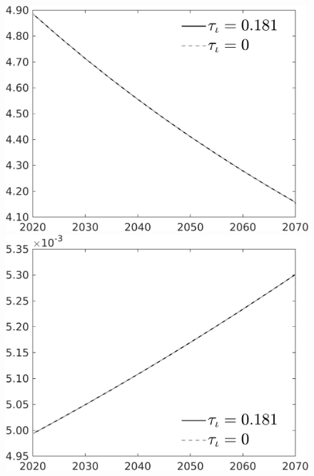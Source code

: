 \documentclass[12pt]{article}
\begin{document}
\begin{figure}[h!!]
\begin{minipage}[]{0.32\textwidth}
	\end{minipage}	
	\begin{minipage}[]{0.32\textwidth}
		\includegraphics[width=1\textwidth]{../../codding_model/own_basedOnFried/optimalPol_010922_revision/figures/all_13Sept22/CompTauf_bytaul_Reg0_gAn_spillover0_nsk0_xgr1_knspil0_sep0_LFlimit1_emsbase0_countec0_GovRev0_etaa0.79_lgd1.png}
	\end{minipage}	
	\begin{minipage}[]{0.32\textwidth}
		\includegraphics[width=1\textwidth]{../../codding_model/own_basedOnFried/optimalPol_010922_revision/figures/all_13Sept22/CompTauf_bytaul_Reg0_gAg_spillover0_nsk0_xgr1_knspil0_sep0_LFlimit1_emsbase0_countec0_GovRev0_etaa0.79_lgd1.png}
	\end{minipage}	
\end{figure}
\end{document}

